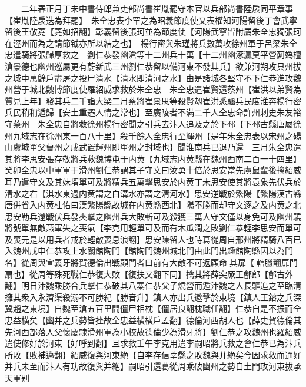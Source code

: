 　　二年春正月丁未中書侍郎兼吏部尚書崔胤罷守本官以兵部尚書陸扆同平章事【崔胤陸扆迭為拜罷】　朱全忠表李罕之為昭義節度使又表權知河陽留後丁會武寧留後王敬蕘【蕘如招翻】彰義留後張珂並為節度使【河陽武寧皆附屬朱全忠獨張珂在涇州而為之請節钺亦所以結之也】　楊行密與朱瑾將兵數萬攻徐州軍于呂梁朱全忠遣騎將張歸厚救之　劉仁恭發幽滄等十二州兵十萬【十二州幽涿瀛莫平營薊媯檀滄景德也幽州巡屬更有蔚新武三州劉仁恭留以備河東不發其兵】欲兼河朔攻貝州拔之城中萬餘戶盡屠之投尸清水【清水即清河之水】由是諸城各堅守不下仁恭進攻魏州營于城北魏博節度使羅紹威求救於朱全忠　朱全忠遣崔賢還蔡州【崔洪以弟賢為質見上年】發其兵二千詣大梁二月蔡將崔景思等殺賢刼崔洪悉驅兵民度淮奔楊行密兵民稍稍遁歸【安土重遷人情之常也】至廣陵者不滿二千人全忠命許州刺史朱友裕守蔡州　朱全忠自將救徐州楊行密聞之引兵去汴人追及之於下邳【下邳古縣唐屬徐州九域志在徐州東一百八十里】殺千餘人全忠行至輝州【是年朱全忠表以宋州之碭山虞城單父曹州之成武置輝州即單州之封域也】聞淮南兵已退乃還　三月朱全忠遣其將李思安張存敬將兵救魏博屯于内黄【九域志内黄縣在魏州西南二百一十四里】癸卯全忠以中軍軍于滑州劉仁恭謂其子守文曰汝勇十倍於思安當先虜鼠輩後擒紹威耳乃遣守文及其妹壻單可及將精兵五萬擊思安於内黄丁未思安使其將袁象先伏兵於清水之右【淇水東過内黄謂之白溝水亦謂之清河水】思安逆戰於繁陽【繁陽漢古縣唐併省入内黄杜佑曰漢繁陽縣故城在内黄縣西北】陽不勝而却守文逐之及内黄之北思安勒兵還戰伏兵發夾擊之幽州兵大敗斬可及殺獲三萬人守文僅以身免可及幽州驍將號單無敵燕軍失之喪氣【李克用輕單可及而有木瓜澗之敗劉仁恭輕李思安而單可及喪元是以用兵者戒於輕敵喪息浪翻】思安陳留人也時葛從周自邢州將精騎八百已入魏州戊申仁恭攻上水關館陶門【館陶門魏州城北門由此門出趣館陶縣因以為門名】從周與宣義牙將賀德倫出戰顧門者曰前有大敵不可返顧命其扉【轄臘翻扉門扇也】從周等殊死戰仁恭復大敗【復扶又翻下同】擒其將薛突厥王鄶郎【鄶古外翻】明日汴魏乘勝合兵擊仁恭破其八寨仁恭父子燒營而遁汴魏之人長驅追之至臨清擁其衆入永濟渠殺溺不可勝紀【勝音升】鎮人亦出兵邀擊於東境【鎮人王鎔之兵深冀趙之東境】自魏至滄五百里間僵尸相枕【僵居良翻枕職任翻】仁恭自是不振而全忠益横矣【幽并之兵勢皆挫故全忠益横横戶孟翻】德倫河西胡人也【薛史賀德倫其先河西部落人父懷慶隸滑州軍為小校故德倫少為滑牙將】劉仁恭之攻魏州也羅紹威遣使修好於河東【好呼到翻】且求救壬午李克用遣李嗣昭將兵救之會仁恭已為汴兵所敗【敗補邁翻】紹威復與河東絶【自李存信莘縣之敗魏與并絶矣今因求救而通好并兵未至而汴人有功故復與并絶】嗣昭引還葛從周乘破幽州之勢自土門攻河東拔承天軍别

